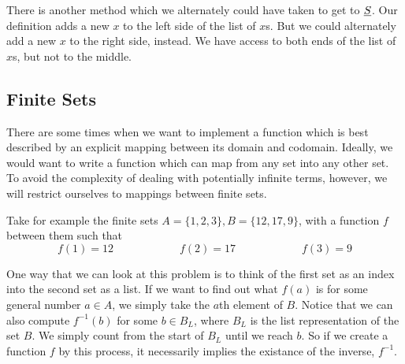 
There is another method which we alternately could have taken to get to $\uline{S}$. Our definition adds a new $x$ to the left side of the list of $x$s. But we could alternately add a new $x$ to the right side, instead. We have access to both ends of the list of $x$s, but not to the middle.

\subsection{Finite Sets}
There are some times when we want to implement a function which is best described by an explicit mapping between its domain and codomain. Ideally, we would want to write a function which can map from any set into any other set. To avoid the complexity of dealing with potentially infinite terms, however, we will restrict ourselves to mappings between finite sets.\\

Take for example the finite sets $A = \{1,2,3\}, B = \{12,17,9\}$, with a function $f$ between them such that
\begin{equation*}
  f(1) = 12 \hspace{1in} f(2) = 17 \hspace{1in} f(3) = 9
\end{equation*}

One way that we can look at this problem is to think of the first set as an index into the second set as a list. If we want to find out what $f(a)$ is for some general number $a \in A$, we simply take the $a$th element of $B$. Notice that we can also compute $f^{-1}(b)$ for some $b \in B_L$, where $B_L$ is the list representation of the set $B$. We simply count from the start of $B_L$ until we reach $b$. So if we create a function $f$ by this process, it necessarily implies the existance of the inverse, $f^{-1}$.\\

